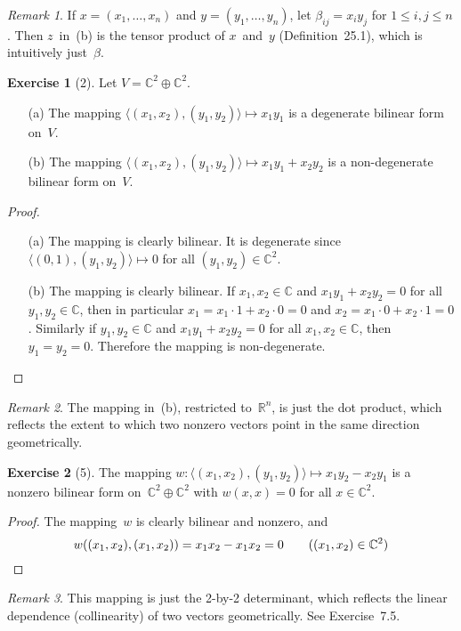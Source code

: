\documentclass[letterpaper,12pt]{article}
\newcommand{\R}{\mathbb{R}}
\newcommand{\C}{\mathbb{C}}
\newcommand{\dsum}{\oplus}
\newcommand{\pair}[2]{\langle{#1},{#2}\rangle}
\theoremstyle{definition}
\newtheorem*{exer}{Exercise}
\theoremstyle{remark}
\newtheorem*{rmk}{Remark}
\theoremstyle{direction}
\begin{document}
\begin{rmk}
If \(x=(x_1,\ldots,x_n)\) and \(y=(y_1,\ldots,y_n)\), let \(\beta_{ij}=x_iy_j\) for \(1\le i,j\le n\). Then \(z\)~in~(b) is the tensor product of \(x\)~and~\(y\) (Definition~25.1), which is intuitively just~\(\beta\).
\end{rmk}

\begin{exer}[2]
Let \(V=\C^2\dsum\C^2\).
\begin{enumerate}
\item[(a)] The mapping \(\pair{(x_1,x_2)}{(y_1,y_2)}\mapsto x_1y_1\) is a degenerate bilinear form on~\(V\).
\item[(b)] The mapping \(\pair{(x_1,x_2)}{(y_1,y_2)}\mapsto x_1y_1+x_2y_2\) is a non-degenerate bilinear form on~\(V\).
\end{enumerate}
\end{exer}
\begin{proof}\
\begin{enumerate}
\item[(a)] The mapping is clearly bilinear. It is degenerate since \(\pair{(0,1)}{(y_1,y_2)}\mapsto 0\) for all \((y_1,y_2)\in\C^2\).
\item[(b)] The mapping is clearly bilinear. If \(x_1,x_2\in\C\) and \(x_1y_1+x_2y_2=0\) for all \(y_1,y_2\in\C\), then in particular \(x_1=x_1\cdot1+x_2\cdot0=0\) and \(x_2=x_1\cdot0+x_2\cdot1=0\). Similarly if \(y_1,y_2\in\C\) and \(x_1y_1+x_2y_2=0\) for all \(x_1,x_2\in\C\), then \(y_1=y_2=0\). Therefore the mapping is non-degenerate.\qedhere
\end{enumerate}
\end{proof}
\begin{rmk}
The mapping in~(b), restricted to~\(\R^n\), is just the dot product, which reflects the extent to which two nonzero vectors point in the same direction geometrically.
\end{rmk}

\begin{exer}[5]
The mapping \(w:\pair{(x_1,x_2)}{(y_1,y_2)}\mapsto x_1y_2-x_2y_1\) is a nonzero bilinear form on~\(\C^2\dsum\C^2\) with \(w(x,x)=0\) for all \(x\in\C^2\).
\end{exer}
\begin{proof}
The mapping~\(w\) is clearly bilinear and nonzero, and
\[w((x_1,x_2),(x_1,x_2))=x_1x_2-x_1x_2=0\qquad((x_1,x_2)\in\C^2)\qedhere\]
\end{proof}
\begin{rmk}
This mapping is just the 2-by-2 determinant, which reflects the linear dependence (collinearity) of two vectors geometrically. See Exercise~7.5.
\end{rmk}
\end{document}
